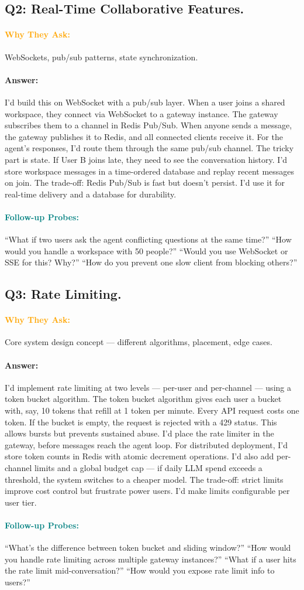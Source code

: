 \documentclass[11pt,a4paper]{article}
\newcommand{\Q}[1]{\subsection{#1}}
\newcommand{\Ans}[1]{\paragraph{\textbf{Answer:}} #1}
\newcommand{\Why}{\paragraph{\textcolor{orange}{\textbf{Why They Ask:}}}}
\newcommand{\Probe}{\paragraph{\textcolor{teal}{\textbf{Follow-up Probes:}}}}
\begin{document}
\Q{Q2: Real-Time Collaborative Features.}
\Why WebSockets, pub/sub patterns, state synchronization.
\Ans I'd build this on WebSocket with a pub/sub layer. When a user joins a shared workspace, they connect via WebSocket to a gateway instance. The gateway subscribes them to a channel in Redis Pub/Sub. When anyone sends a message, the gateway publishes it to Redis, and all connected clients receive it. For the agent's responses, I'd route them through the same pub/sub channel. The tricky part is state. If User B joins late, they need to see the conversation history. I'd store workspace messages in a time-ordered database and replay recent messages on join. The trade-off: Redis Pub/Sub is fast but doesn't persist. I'd use it for real-time delivery and a database for durability.
\Probe ``What if two users ask the agent conflicting questions at the same time?'' ``How would you handle a workspace with 50 people?'' ``Would you use WebSocket or SSE for this? Why?'' ``How do you prevent one slow client from blocking others?''

\Q{Q3: Rate Limiting.}
\Why Core system design concept --- different algorithms, placement, edge cases.
\Ans I'd implement rate limiting at two levels --- per-user and per-channel --- using a token bucket algorithm. The token bucket algorithm gives each user a bucket with, say, 10 tokens that refill at 1 token per minute. Every API request costs one token. If the bucket is empty, the request is rejected with a 429 status. This allows bursts but prevents sustained abuse. I'd place the rate limiter in the gateway, before messages reach the agent loop. For distributed deployment, I'd store token counts in Redis with atomic decrement operations. I'd also add per-channel limits and a global budget cap --- if daily LLM spend exceeds a threshold, the system switches to a cheaper model. The trade-off: strict limits improve cost control but frustrate power users. I'd make limits configurable per user tier.
\Probe ``What's the difference between token bucket and sliding window?'' ``How would you handle rate limiting across multiple gateway instances?'' ``What if a user hits the rate limit mid-conversation?'' ``How would you expose rate limit info to users?''
\end{document}
